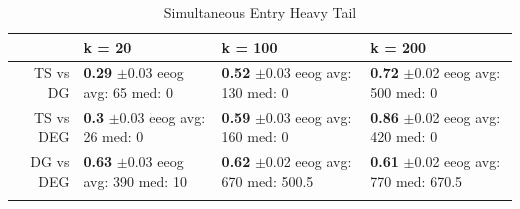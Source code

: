 \documentclass{article}
\theoremstyle{definition}
\begin{document}
\begin{table}[ht]
\centering
\caption{Simultaneous Entry Heavy Tail} 
\begin{tabular}{rlll}
  \hline
 & k = 20 & k = 100 & k = 200 \\ 
  \hline
TS vs DG & \makecell{\textbf{0.29} $\pm$0.03\\ eeog \\ avg: 65\\ med: 0} & \makecell{\textbf{0.52} $\pm$0.03\\ eeog \\ avg: 130\\ med: 0} & \makecell{\textbf{0.72} $\pm$0.02\\ eeog \\ avg: 500\\ med: 0} \\ 
  TS vs DEG & \makecell{\textbf{0.3} $\pm$0.03\\ eeog \\ avg: 26\\ med: 0} & \makecell{\textbf{0.59} $\pm$0.03\\ eeog \\ avg: 160\\ med: 0} & \makecell{\textbf{0.86} $\pm$0.02\\ eeog \\ avg: 420\\ med: 0} \\ 
  DG vs DEG & \makecell{\textbf{0.63} $\pm$0.03\\ eeog \\ avg: 390\\ med: 10} & \makecell{\textbf{0.62} $\pm$0.02\\ eeog \\ avg: 670\\ med: 500.5} & \makecell{\textbf{0.61} $\pm$0.02\\ eeog \\ avg: 770\\ med: 670.5} \\ 
   \hline
   \label{hm_ht}
\end{tabular}
\end{table}
\end{document}
